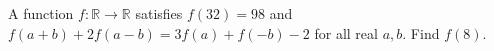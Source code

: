 A function $f\colon\mathbb R\to\mathbb R$ satisfies $f(32)=98$ and $f(a+b)+2f(a-b)=3f(a)+f(-b)-2$ for all real $a,b$. Find $f(8)$.
